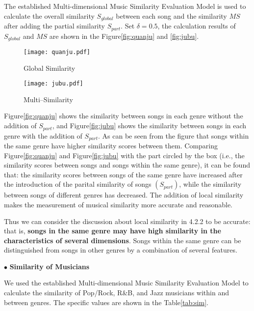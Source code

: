 \documentclass[12pt]{article}  %
\begin{document}
The established Multi-dimensional Music Similarity Evaluation Model is used to calculate the overall similarity $S_{global}$ between each song and the similarity $MS$ after adding the partial similarity $S_{part}$. Set $\delta = 0.5$, the calculation results of $S_{global}$ and $MS$ are shown in the Figure\eqref{fig:quanju} and \eqref{fig:jubu}.

\begin{figure}[htbp]
	\centering
	\begin{minipage}[t]{0.49\textwidth}
		\centering
		\texttt{[image: quanju.pdf]}
		\caption{Global Similarity}\label{fig:quanju}
	\end{minipage}
	\begin{minipage}[t]{0.49\textwidth}
		\centering
		\texttt{[image: jubu.pdf]}
		\caption{Multi--Similarity}\label{fig:jubu}
	\end{minipage}
\end{figure}

Figure\eqref{fig:quanju} shows the similarity between songs in each genre without the addition of $S_{part}$, and Figure\eqref{fig:jubu} shows the similarity between songs in each genre with the addition of $S_{part}$. As can be seen from the figure that songs within the same genre have higher similarity scores between them. Comparing Figure\eqref{fig:quanju} and Figure\eqref{fig:jubu} with the part circled by the box (i.e., the similarity scores between songs and songs within the same genre), it can be found that: the similarity scores between songs of the same genre have increased after the introduction of the parital similarity of songs $(S_{part})$, while the similarity between songs of different genres has decreased. The addition of local similarity makes the measurement of musical similarity more accurate and reasonable.

Thus we can consider the discussion about local similarity in 4.2.2 to be accurate: that is, \textbf{songs in the same genre may have high similarity in the characteristics of several dimensions}. Songs within the same genre can be distinguished from songs in other genres by a combination of several features.

$\bullet$ \textbf{Similarity of Musicians}

We used the established Multi-dimensional Music Similarity Evaluation Model to calculate the similarity of Pop/Rock, R\&B, and Jazz musicians within and between genres. The specific values are shown in the Table\eqref{tab:sim}.
\end{document}
